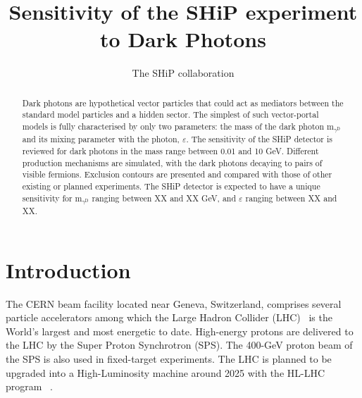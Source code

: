\documentclass[12pt,a4paper,]{article}
\begin{document}
\renewcommand{\thefootnote}{\fnsymbol{footnote}}
\setcounter{footnote}{1}

\title{Sensitivity of the SHiP experiment to Dark Photons}

\author{The SHiP collaboration}

\maketitle

\begin{abstract}

Dark photons are hypothetical vector particles that could act as
mediators between the standard model particles and a hidden
sector. The simplest of such vector-portal models is fully
characterised by only two parameters: the mass of the dark photon
m$_{\gamma^{\mathrm{D}}}$ and its mixing parameter with the photon,
$\varepsilon$. The sensitivity of the SHiP detector is reviewed for
dark photons in the mass range between 0.01 and 10 GeV. Different
production mechanisms are simulated, with the dark photons decaying to
pairs of visible fermions. Exclusion contours are presented and
compared with those of other existing or planned experiments. The SHiP
detector is expected to have a unique sensitivity for
m$_{\gamma^{\mathrm{D}}}$ ranging between XX and XX GeV, and
$\varepsilon$ ranging between XX and XX.

\end{abstract}

\renewcommand{\thefootnote}{\arabic{footnote}}
\setcounter{footnote}{0}

\tableofcontents
\cleardoublepage

\pagestyle{plain} %
\setcounter{page}{1}

\section{Introduction}
\label{sec:intro}

The CERN beam facility located near Geneva, Switzerland, comprises
several particle accelerators among which the Large Hadron Collider
(LHC)~\cite{LHC} is the World's largest and most energetic to
date. High-energy protons are delivered to the LHC by the Super Proton
Synchrotron (SPS). The 400-GeV proton beam of the SPS is also used in
fixed-target experiments. The LHC is planned to be upgraded into a
High-Luminosity machine around 2025 with the HL-LHC program
~\cite{Apollinari:2015bam}.
\end{document}
